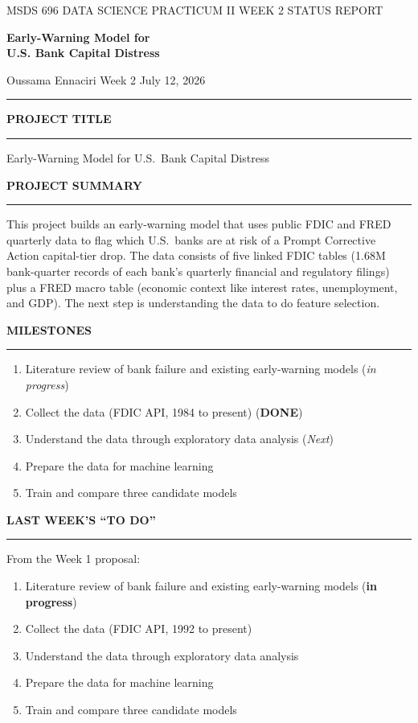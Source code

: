 \documentclass[11pt,letterpaper]{article}
\newcommand{\sectionhead}[1]{%
  \vspace{6pt}%
  {\sffamily\bfseries\fontsize{9.5}{12}\selectfont\color{navy}\MakeUppercase{#1}}\par
  \vspace{-9pt}\textcolor{hairline}{\rule{\textwidth}{0.5pt}}\par\vspace{0pt}}
\newcommand{\answer}[1]{#1\par\vspace{3pt}}
\begin{document}
\vspace*{-14pt}
{\sffamily\fontsize{8.5}{11}\selectfont\color{midgray}MSDS 696 DATA SCIENCE PRACTICUM II \quad\textbar\quad WEEK 2 STATUS REPORT}\par\vspace{10pt}
{\sffamily\bfseries\fontsize{21}{25}\selectfont\color{navy}Early-Warning Model for\\U.S. Bank Capital Distress}\par\vspace{9pt}
{\sffamily\fontsize{9}{12}\selectfont Oussama Ennaciri \quad\textbar\quad Week 2 \quad\textbar\quad July 12, 2026}\par\vspace{5pt}
\textcolor{navy}{\rule{\textwidth}{1.2pt}}

\sectionhead{Project title}
\answer{Early-Warning Model for U.S.\ Bank Capital Distress}

\sectionhead{Project summary}
\answer{This project builds an early-warning model that uses public FDIC and FRED quarterly data to flag which U.S.\ banks are at risk of a Prompt Corrective Action capital-tier drop. The data consists of five linked FDIC tables (1.68M bank-quarter records of each bank's quarterly financial and regulatory filings) plus a FRED macro table (economic context like interest rates, unemployment, and GDP). The next step is understanding the data to do feature selection.}

\sectionhead{Milestones}
\answer{\begin{enumerate}[topsep=1pt,itemsep=1pt,leftmargin=16pt,label=\textcolor{navy}{\bfseries\arabic*.}]
  \item Literature review of bank failure and existing early-warning models (\textit{in progress})
  \item Collect the data (FDIC API, 1984 to present) (\textbf{DONE})
  \item Understand the data through exploratory data analysis (\textit{Next})
  \item Prepare the data for machine learning
  \item Train and compare three candidate models
\end{enumerate}}

\sectionhead{Last week's ``To Do''}
\answer{From the Week 1 proposal:
\begin{enumerate}[topsep=1pt,itemsep=1pt,leftmargin=16pt,label=\textcolor{navy}{\bfseries\arabic*.}]
  \item Literature review of bank failure and existing early-warning models (\textbf{in progress})
  \item Collect the data (FDIC API, 1992 to present)
  \item Understand the data through exploratory data analysis
  \item Prepare the data for machine learning
  \item Train and compare three candidate models
\end{enumerate}}
\end{document}
